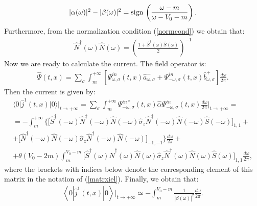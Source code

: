 \documentclass[12pt]{article}
\numberwithin{equation}{section}
\begin{document}
$$
|\alpha(\omega)|^2-|\beta(\omega)|^2={\rm sign} \, \left(\frac{\omega-m}{\omega-V_0-m}\right).
$$ 
Furthermore, from the normalization condition (\ref{normcond}) we obtain that: 
\begin{gather}
\hat{N}^{\dagger}(\omega)\hat{N}(\omega)=\left(\frac{1+\hat{S}^{\dagger}(\omega)\hat{S}(\omega)}{2}\right)^{-1}
\end{gather}
Now we are ready to calculate the current. The field operator is:
\begin{gather}
\hat{\mathit{\Psi}}(t,x)=\sum_{\sigma}\int^{+\infty}_{m} \left[\mathit{\Psi}^{in}_{\omega,\sigma}(t,x)\hat{a}^{-}_{\omega,\sigma}+\mathit{\Psi}^{in}_{-\omega,\sigma}(t,x)\hat{b}^{+}_{\omega,\sigma}\right]\frac{d\omega}{2\pi}.
\end{gather}
Then the current is given by:
\begin{gather}
\Big\langle0\Big|\hat{j}^{1}(t,x)\Big|0\Big\rangle\Big|_{t\rightarrow+\infty}= \sum_\sigma \int_{m}^{+\infty}\mathit{\Psi}^{in*}_{-\omega,\sigma}(t,x)\hat{\alpha}\mathit{\Psi}^{in}_{-\omega,\sigma}(t,x)\frac{d\omega}{2\pi}\Big|_{t\rightarrow+\infty}=\nonumber\\=-\int^{+\infty}_{m}\Bigg\{\Big[\hat{S}^{\dagger}(-\omega)\hat{N}^{\dagger}(-\omega)\hat{N}(-\omega)\hat{\sigma}_z\hat{N}^{\dagger}(-\omega)\hat{N}(-\omega)\hat{S}(-\omega)\Big]_{1,1}+ \\ \nonumber+\Big[\hat{N}^{\dagger}(-\omega)\hat{N}(-\omega)\hat{\sigma}_z\hat{N}^{\dagger}(-\omega)\hat{N}(-\omega)\Big]_{-1,-1}\Bigg\}\frac{d\omega}{2\pi}+\\\nonumber+\theta(V_0-2m)\int^{V_0-m}_{m}\Big[\hat{S}^{\dagger}(\omega)\hat{N}^{\dagger}(\omega)\hat{N}(\omega)\hat{\sigma}_z\hat{N}^{\dagger}(\omega)\hat{N}(\omega)\hat{S}(\omega)\Big]_{1,1}\frac{d\omega}{2\pi},
\end{gather}
where the brackets with indices below denote the corresponding element of this matrix in the notation of (\ref{matrxiel}).
Finally, we obtain that:
\begin{gather}
\boxed{\left\langle0\left|\hat{j}^{1}(t,x)\right|0\right\rangle\Big|_{t\to +\infty}\simeq -\int^{V_0-m}_{m}\frac{1}{|\beta(\omega)|^2}\frac{d\omega}{2\pi}.}
\end{gather}
\end{document}
